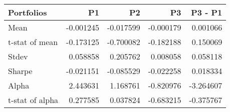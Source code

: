 \begin{tabular}{lrrrr}
\toprule
Portfolios & P1 & P2 & P3 & P3 - P1 \\
\midrule
Mean & -0.001245 & -0.017599 & -0.000179 & 0.001066 \\
t-stat of mean & -0.173125 & -0.700082 & -0.182188 & 0.150069 \\
Stdev & 0.058858 & 0.205762 & 0.008058 & 0.058118 \\
Sharpe & -0.021151 & -0.085529 & -0.022258 & 0.018334 \\
Alpha & 2.443631 & 1.168761 & -0.820976 & -3.264607 \\
t-stat of alpha & 0.277585 & 0.037824 & -0.683215 & -0.375767 \\
\bottomrule
\end{tabular}
